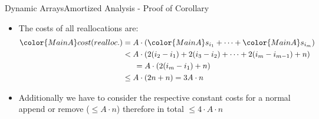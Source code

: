 
\begin{frame}{Dynamic Arrays}{Amortized Analysis - Proof of Corollary}
  \begin{itemize}
    \item
      The {\color{MainA}costs} of all reallocations are:
      \begin{align*}
        {\color{MainA}cost}(realloc.)
          & = A \cdot \left(
              {\color{MainA}s_{i_1}}+\dots+{\color{MainA}s_{i_m}}
            \right)\\
          & < A \cdot \left(
              2(i_2-i_1)+2(i_3-i_2)+\dots+2(i_m-i_{m-1}) + n
            \right)\\
          & \hspace{1.5em} = A \cdot \left(
              2 (i_m - i_1) + n
            \right)\\
          & \leq A \cdot \left(2n + n\right) = 3A \cdot n
      \end{align*}
    \item
      Additionally we have to consider the respective constant costs for
      a normal append or remove ({\color{MainA}$\leq A \cdot n$}) therefore in total {\color{MainA}$\leq 4 \cdot A \cdot n$}
  \end{itemize}
\end{frame}


